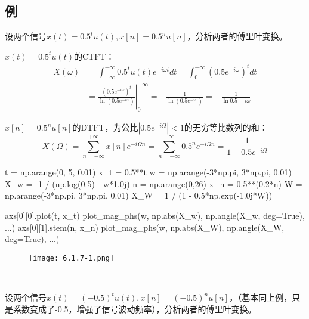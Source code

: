 \subsection{例}

\begin{example}
设两个信号$x\left( t \right) =0.5^tu\left( t \right) ,x\left[ n \right] =0.5^nu\left[ n \right] $，分析两者的傅里叶变换。
\end{example}

$x\left( t \right) =0.5^tu\left( t \right) $的CTFT：
\begin{align*}
X\left( \omega \right) &=\int_{-\infty}^{+\infty}{0.5^tu\left( t \right) e^{-i\omega t}dt}=\int_0^{+\infty}{\left( 0.5e^{-i\omega} \right) ^tdt} \\
&=\left. \frac{\left( 0.5e^{-i\omega} \right) ^t}{\ln \left( 0.5e^{-i\omega} \right)} \right|_{0}^{+\infty}=-\frac{1}{\ln \left( 0.5e^{-i\omega} \right)}=-\frac{1}{\ln 0.5-i\omega}
\end{align*}

$x\left[ n \right] =0.5^nu\left[ n \right] $的DTFT，为公比$\left| 0.5e^{-i\varOmega} \right|<1$的无穷等比数列的和：
\[
X\left( \varOmega \right) =\sum_{n=-\infty}^{+\infty}{x\left[ n \right] e^{-i\varOmega n}}=\sum_{n=-\infty}^{+\infty}{0.5^ne^{-i\varOmega n}}=\frac{1}{1-0.5e^{-i\varOmega}}
\]

\begin{python}
t   = np.arange(0, 5, 0.01)
x_t = 0.5**t
w   = np.arange(-3*np.pi, 3*np.pi, 0.01)
X_w = -1 / (np.log(0.5) - w*1.0j)
n   = np.arange(0,26)
x_n = 0.5**(0.2*n)
W   = np.arange(-3*np.pi, 3*np.pi, 0.01)
X_W = 1 / (1 - 0.5*np.exp(-1.0j*W))

axs[0][0].plot(t, x_t)
plot_mag_phs(w, np.abs(X_w), np.angle(X_w, deg=True), ...)
axs[0][1].stem(n, x_n)
plot_mag_phs(w, np.abs(X_W), np.angle(X_W, deg=True), ...)
\end{python}

\begin{figure}[h]
\centering
\texttt{[image: 6.1.7-1.png]}
\end{figure}

~

\begin{example}
设两个信号$x\left( t \right) =\left( -0.5 \right) ^tu\left( t \right) ,x\left[ n \right] =\left( -0.5 \right) ^nu\left[ n \right] $，（基本同上例，只是系数变成了-0.5，增强了信号波动频率），分析两者的傅里叶变换。
\end{example}

